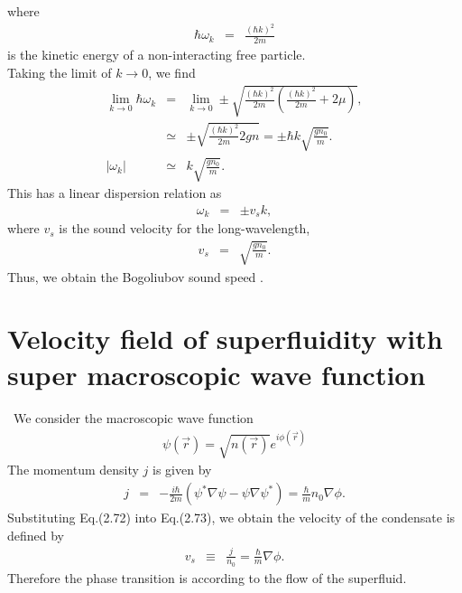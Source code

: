 \documentclass[12pt,a4paper]{jbook}
\begin{document}
where
\begin{eqnarray}
\hbar \omega_k & = & \frac{(\hbar k)^2}{2m}
\end{eqnarray}
is the kinetic energy of a non-interacting free particle.
\\
Taking the limit of $k \rightarrow 0$, we find
\begin{eqnarray}
\lim_{k \rightarrow 0} \hbar \omega_k & = & \lim_{k \rightarrow 0} \pm \sqrt{\frac{(\hbar k)^2}{2m} \left( \frac{(\hbar k)^2}{2m} + 2\mu \right)},
\\
& \simeq & \pm \sqrt{\frac{(\hbar k)^2}{2m} 2 g n} = \pm \hbar k \sqrt{\frac{gn_0}{m}}.
\\
|\omega_k| & \simeq & k \sqrt{\frac{gn_0}{m}}.
\end{eqnarray}
This has a linear dispersion relation as
\begin{eqnarray}
\omega_k & = & \pm v_s k,
\end{eqnarray}
where $v_s$ is the sound velocity for the long-wavelength,
\\
\begin{eqnarray}
v_s & = & \sqrt{\frac{g n_0}{m}}.
\end{eqnarray}
Thus, we obtain the Bogoliubov sound speed \cite{18}.
%

\section{Velocity field of superfluidity with super macroscopic wave function}
\ We consider the macroscopic wave function
\begin{eqnarray}
\psi(\vec{r}) = \sqrt{n(\vec{r})} e^{i \phi(\vec{r})}
\end{eqnarray}
The momentum density $j$ is given by
\begin{eqnarray}
j & = & - \frac{i \hbar}{2m} \left( \psi^* \nabla \psi - \psi \nabla \psi^* \right) = \frac{\hbar}{m} n_0 \nabla \phi.
\end{eqnarray}
Substituting Eq.(2.72) into Eq.(2.73),
we obtain the velocity of the condensate is defined by
\begin{eqnarray}
v_{s} & \equiv & \frac{j}{n_0} = \frac{\hbar}{m} \nabla \phi.
\end{eqnarray}
Therefore the phase transition is according to the flow of the superfluid.
\fi
\end{document}
